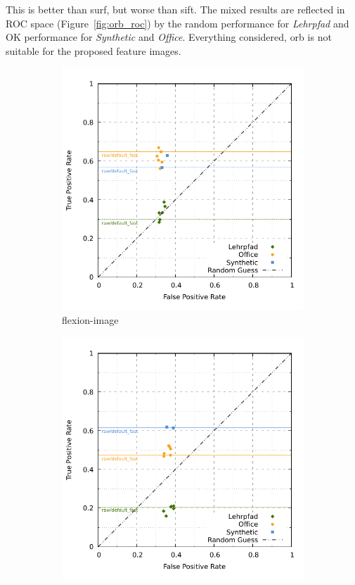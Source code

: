 This is better than \acrshort{surf}, but worse than \acrshort{sift}.
The mixed results are reflected in ROC space (Figure~\ref{fig:orb_roc}) by the random performance for \emph{Lehrpfad} and OK performance for \emph{Synthetic} and \emph{Office}.
Everything considered, \acrshort{orb} is not suitable for the proposed feature images.
\begin{figure}[H]
\begin{subfigure}[t]{0.45\linewidth}
    \includegraphics[width=\linewidth]{chapter06/results/ORB/flexion/roc.pdf}%
    \caption{\gls{flexion-image}}
\end{subfigure}\quad
\begin{subfigure}[t]{0.45\linewidth}
    \includegraphics[width=\linewidth]{chapter06/results/ORB/bearing/roc.pdf}

\end{subfigure}
\end{figure}
